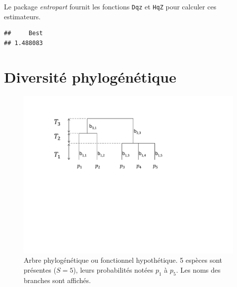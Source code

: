 \documentclass[
  11pt,
  french,
  a4paper,
  extrafontsizes,onecolumn,openright
  ]{memoir}
\newenvironment{Shaded}{\begin{snugshade}}{\end{snugshade}}
\newcommand{\AttributeTok}[1]{\textcolor[rgb]{0.13,0.29,0.53}{#1}}
\newcommand{\CommentTok}[1]{\textcolor[rgb]{0.56,0.35,0.01}{\textit{#1}}}
\newcommand{\DecValTok}[1]{\textcolor[rgb]{0.00,0.00,0.81}{#1}}
\newcommand{\FunctionTok}[1]{\textcolor[rgb]{0.13,0.29,0.53}{\textbf{#1}}}
\newcommand{\NormalTok}[1]{#1}
\newcommand{\OtherTok}[1]{\textcolor[rgb]{0.56,0.35,0.01}{#1}}
\newcommand{\SpecialCharTok}[1]{\textcolor[rgb]{0.81,0.36,0.00}{\textbf{#1}}}
\begin{document}
Le package \emph{entropart} fournit les fonctions \texttt{Dqz} et \texttt{HqZ} pour calculer ces estimateurs.

\scriptsize

\begin{Shaded}
\end{Shaded}

\begin{verbatim}
##     Best 
## 1.488083
\end{verbatim}

\normalsize

\section{Diversité phylogénétique}\label{diversituxe9-phyloguxe9nuxe9tique}



\scriptsize

\begin{figure}

{\centering \includegraphics[width=0.8\linewidth]{images/ArbreA} 

}

\caption{Arbre phylogénétique ou fonctionnel hypothétique. 5 espèces sont présentes (\(S=5\)), leurs probabilités notées \(p_1\) à \(p_5\). Les noms des branches sont affichés.}\label{fig:ArbreA6}
\end{figure}
\end{document}
